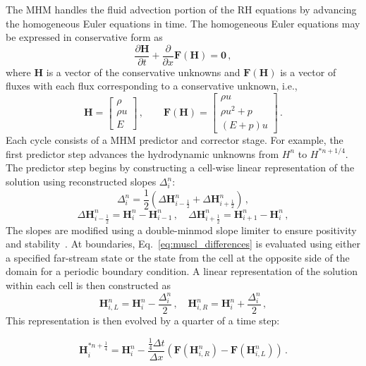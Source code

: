 \documentclass[preprint,12pt]{elsarticle}
\newcommand{\dxdy}[2]{\frac{\partial #1}{\partial #2}}
\newcommand{\dydt}[1]{\frac{\partial #1}{\partial t}}
\newcommand{\pec}{\, ,}
\newcommand{\pep}{\, .}
\newcommand{\half}{\frac{1}{2}}
\newcommand{\fourth}{\frac{1}{4}}
\newcommand{\E}{{E_r}}
\renewcommand{\H}{\mathbf{H}}
\newcommand{\Flux}{\mathbf{F}}
\newcommand{\dt}{\Delta t}
\newcommand{\dx}{\Delta x}
\newcommand{\iL}{_{i,L}}
\newcommand{\iR}{_{i,R}}
\newcommand{\hydroPredictor}[4]{
\begin{equation}#4
  \H_i^{#2} = \H_i^{#1} - \frac{#3\dt}{\dx}
  \left(\Flux(\H\iR^{#1}) - \Flux(\H\iL^{#1})\right) \pep
\end{equation}
}
\begin{document}
The MHM handles the fluid advection portion of the RH equations by advancing the homogeneous Euler equations
in time.   The homogeneous Euler equations may be expressed in conservative form as
\begin{equation}
    \dydt{\H} + \dxdy{}{x}\Flux(\H) = \mathbf{0} \pec
\end{equation}
where $\H$ is a vector of the conservative unknowns
and $\Flux(\H)$ is a vector of fluxes with each flux corresponding to a conservative
unknown, i.e.,
\begin{equation}
  \H=\left[\begin{array}{c}\rho\\\rho u\\E\end{array}\right] \pec\qquad
  \Flux(\H)=\left[\begin{array}{c}\rho u\\
  \rho u^2 + p\\
  (E+p)u\end{array}\right] \pep
\end{equation}
Each cycle consists of a MHM predictor and corrector stage. For example, the first predictor step advances the hydrodynamic unknowns
from $H^{n}$ to $H^{*n+1/4}$.
The predictor step begins by constructing a cell-wise linear representation of the solution
using reconstructed slopes $\Delta_i^n$:
\begin{equation}\label{eq:muscl_slopes}
  \Delta_i^n = \half\left(\Delta\H_{i-\half}^n + \Delta\H_{i+\half}^n\right) \pec
\end{equation}
\begin{equation}\label{eq:muscl_differences}
  \Delta\H_{i-\half}^n = \H_i^n - \H_{i-1}^n \pec\quad
  \Delta\H_{i+\half}^n = \H_{i+1}^n - \H_i^n \pec
\end{equation}
The slopes are modified using a double-minmod slope
limiter to ensure positivity and stability~\cite{mclow2008}.
At boundaries, Eq.~\eqref{eq:muscl_differences} is evaluated using either a specified far-stream state or the state from the cell at
the opposite side of the domain for a periodic boundary condition.
A linear representation
of the solution within each cell is then constructed as
\begin{equation}\label{eq:edge_hydro}
  \H\iL^n = \H_i^n - \frac{{\Delta}_i^n}{2} \pec
  \quad
  \H\iR^n = \H_i^n + \frac{{\Delta}_i^n}{2} \pec
\end{equation}
This representation is then evolved by a quarter of a time step:
\hydroPredictor{n}{*n+\fourth}{\fourth}{\label{eq:muscl_predictor}}
\end{document}
